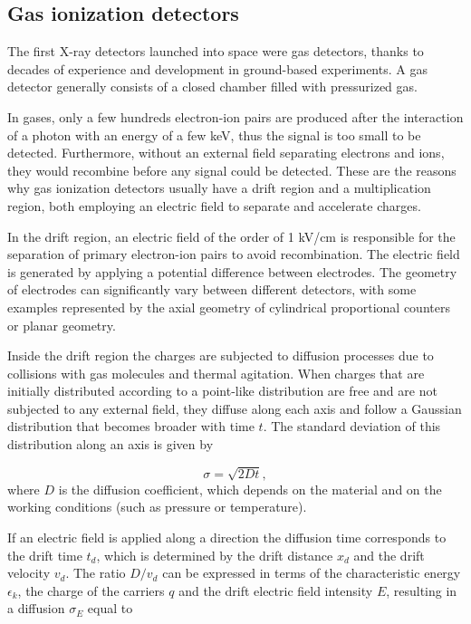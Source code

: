 \subsection{Gas ionization detectors}
The first X-ray detectors launched into space were gas detectors, thanks to decades of experience and development in ground-based experiments. A gas detector generally consists of a closed chamber filled with pressurized gas. 

In gases, only a few hundreds electron-ion pairs are produced after the interaction of a photon with an energy of a few keV, thus the signal is too small to be detected. Furthermore, without an external field separating electrons and ions, they would recombine before any signal could be detected. These are the reasons why gas ionization detectors usually have a drift region and a multiplication region, both employing an electric field to separate and accelerate charges.

In the drift region, an electric field of the order of 1 kV/cm is responsible for the separation of primary electron-ion pairs to avoid recombination. The electric field is generated by applying a potential difference between electrodes. The geometry of electrodes can significantly vary between different detectors, with some examples represented by the axial geometry of cylindrical proportional counters or planar geometry.

Inside the drift region the charges are subjected to diffusion processes due to collisions with gas molecules and thermal agitation. When charges that are initially distributed according to a point-like distribution are free and are not subjected to any external field, they diffuse along each axis and follow a Gaussian distribution that becomes broader with time $t$. The standard deviation of this distribution along an axis is given by

\begin{equation}
\sigma = \sqrt{2D t},
\end{equation}
where $D$ is the diffusion coefficient, which depends on the material and on the working conditions (such as pressure or temperature).

If an electric field is applied along a direction the diffusion time corresponds to the drift time $t_d$, which is determined by the drift distance $x_d$ and the drift velocity $v_d$. The ratio $D/v_d$ can be expressed in terms of the characteristic energy $\epsilon_k$, the charge of the carriers $q$ and the drift electric field intensity $E$, resulting in a diffusion $\sigma_{E}$ equal to


